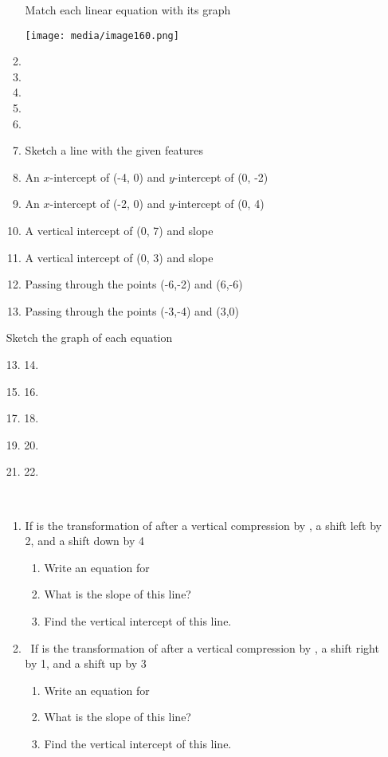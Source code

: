 \begin{enumerate}
\begin{enumerate}
Match each linear equation with its graph

\texttt{[image: media/image160.png]}


\item
\item
\item
\item
\item
\item


Sketch a line with the given features

\item
  An $x$-intercept of (-4, 0) and $y$-intercept of (0, -2)
\item
  An $x$-intercept of (-2, 0) and $y$-intercept of (0, 4)
\item
  A vertical intercept of (0, 7) and slope
\item
  A vertical intercept of (0, 3) and slope
\item
  Passing through the points (-6,-2) and (6,-6)
\item
  Passing through the points (-3,-4) and (3,0)
\end{enumerate}

Sketch the graph of each equation

13. 14.

15. 16.

17. 18.

19. 20.

21. 22.

~

\begin{enumerate}
\def\labelenumi{\arabic{enumi}.}
\setcounter{enumi}{22}
\item
  If is the transformation of after a vertical compression by , a shift
  left by 2, and a shift down by 4

  \begin{enumerate}
  \def\labelenumii{\alph{enumii}.}
  \item
    Write an equation for
  \item
    What is the slope of this line?
  \item
    Find the vertical intercept of this line.
  \end{enumerate}
\item
  ~If is the transformation of after a vertical compression by , a shift
  right by 1, and a shift up by 3

  \begin{enumerate}
  \def\labelenumii{\alph{enumii}.}
  \item
    Write an equation for
  \item
    What is the slope of this line?
  \item
    Find the vertical intercept of this line.
  \end{enumerate}
\end{enumerate}


\end{enumerate}
